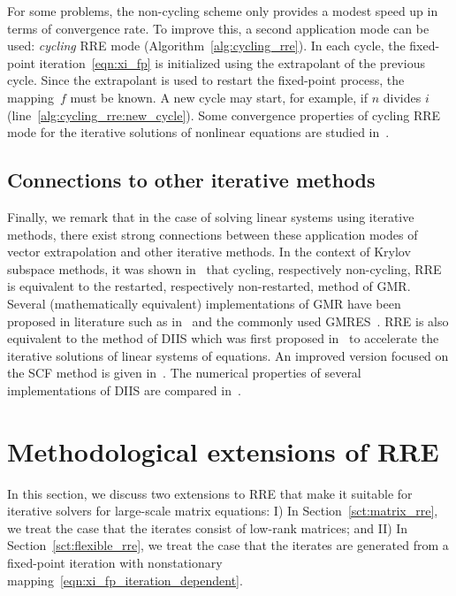 For some problems, the non-cycling scheme only provides a modest speed up in terms of convergence rate.
To improve this, a second application mode can be used: \emph{cycling} \ac{RRE} mode (Algorithm~\ref{alg:cycling_rre}).
In each cycle, the fixed-point iteration~\eqref{eqn:xi_fp} is initialized using the extrapolant of the previous cycle.
Since the extrapolant is used to restart the fixed-point process, the mapping~$f$ must be known.
A new cycle may start, for example, if $n$ divides $i$ (line~\ref{alg:cycling_rre:new_cycle}).
Some convergence properties of cycling \ac{RRE} mode for the iterative solutions of nonlinear equations are studied in~\cite{sidi2020convergence}.

\subsection{Connections to other iterative methods}

Finally, we remark that in the case of solving linear systems using iterative methods, there exist strong connections between these application modes of vector extrapolation and other iterative methods.
In the context of Krylov subspace methods, it was shown in~\cite{sidi1988extrapolation} that cycling, respectively non-cycling, \ac{RRE} is equivalent to the restarted, respectively non-restarted, method of \ac{GMR}.
Several (mathematically equivalent) implementations of \ac{GMR} have been proposed in literature such as in~\cite{axelsson1980conjugate, eisenstat1983variational, young1980generalized} and the commonly used \ac{GMRES}~\cite{saad1986gmres}.
\Ac{RRE} is also equivalent to the method of \ac{DIIS} which was first proposed in~\cite{pulay1980convergence} to accelerate the iterative solutions of linear systems of equations.
An improved version focused on the \ac{SCF} method is given in~\cite{pulay1982improved}.
The numerical properties of several implementations of \ac{DIIS} are compared in~\cite{shepard2007some}.

\section{Methodological extensions of RRE}\label{sct:method}

In this section, we discuss two extensions to \ac{RRE} that make it suitable for iterative solvers for large-scale matrix equations: I) In Section~\ref{sct:matrix_rre}, we treat the case that the iterates consist of low-rank matrices; and II) In Section~\ref{sct:flexible_rre}, we treat the case that the iterates are generated from a fixed-point iteration with nonstationary mapping~\eqref{eqn:xi_fp_iteration_dependent}. %

